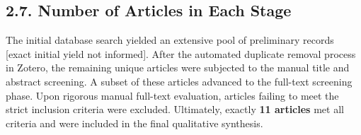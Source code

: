 \hypertarget{number-of-articles-in-each-stage}{%
\subsection{2.7. Number of Articles in Each
Stage}\label{number-of-articles-in-each-stage}}

The initial database search yielded an extensive pool of preliminary
records {[}exact initial yield not informed{]}. After the automated
duplicate removal process in Zotero, the remaining unique articles were
subjected to the manual title and abstract screening. A subset of these
articles advanced to the full-text screening phase. Upon rigorous manual
full-text evaluation, articles failing to meet the strict inclusion
criteria were excluded. Ultimately, exactly \textbf{11 articles} met all
criteria and were included in the final qualitative synthesis.
